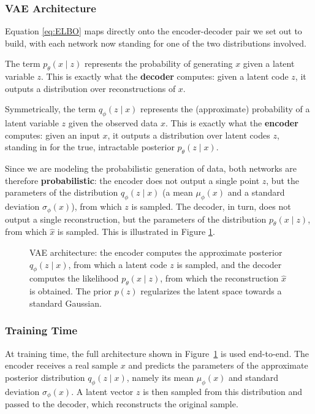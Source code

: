 \subsubsection{VAE Architecture}
Equation \ref{eq:ELBO} maps directly onto the encoder-decoder pair we set out to build, with each network now standing for one of the two distributions involved.

The term $p_\theta(x \mid z)$ represents the probability of generating $x$ given a latent variable $z$. This is exactly what the \textbf{decoder} computes: given a latent code $z$, it outputs a distribution over reconstructions of $x$.

Symmetrically, the term $q_\phi(z \mid x)$ represents the (approximate) probability of a latent variable $z$ given the observed data $x$. This is exactly what the \textbf{encoder} computes: given an input $x$, it outputs a distribution over latent codes $z$, standing in for the true, intractable posterior $p_\theta(z \mid x)$.

Since we are modeling the probabilistic generation of data, both networks are therefore \textbf{probabilistic}: the encoder does not output a single point $z$, but the parameters of the distribution $q_\phi(z \mid x)$ (a mean $\mu_\phi(x)$ and a standard deviation $\sigma_\phi(x)$), from which $z$ is sampled. The decoder, in turn, does not output a single reconstruction, but the parameters of the distribution $p_\theta(x \mid z)$, from which $\hat{x}$ is sampled. This is illustrated in Figure \ref{fig:vae-architecture}.

\begin{figure}[H]
    \centering
    \resizebox{0.5\textwidth}{!}{}
    \caption{VAE architecture: the encoder computes the approximate posterior $q_\phi(z \mid x)$, from which a latent code $z$ is sampled, and the decoder computes the likelihood $p_\theta(x \mid z)$, from which the reconstruction $\hat{x}$ is obtained. The prior $p(z)$ regularizes the latent space towards a standard Gaussian.}
    \label{fig:vae-architecture}
\end{figure}

\subsubsection{Training Time}

At training time, the full architecture shown in Figure~\ref{fig:vae-architecture} is used end-to-end. The encoder receives a real sample $x$ and predicts the parameters of the approximate posterior distribution $q_\phi(z \mid x)$, namely its mean $\mu_\phi(x)$ and standard deviation $\sigma_\phi(x)$. A latent vector $z$ is then sampled from this distribution and passed to the decoder, which reconstructs the original sample.

